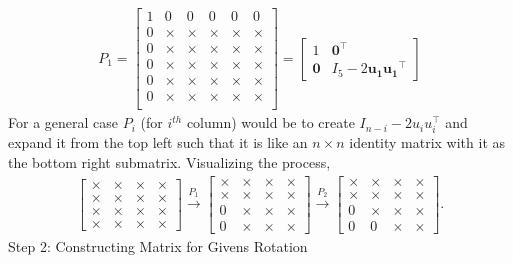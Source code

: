 \documentclass[journal]{IEEEtran}
\begin{document}
\begin{align}
P_1 = \begin{bmatrix}
1 & 0 & 0 & 0 & 0 & 0 \\
0 & \times & \times & \times & \times & \times \\
0 & \times & \times & \times & \times & \times \\
0 & \times & \times & \times & \times & \times \\
0 & \times & \times & \times & \times & \times \\
0 & \times & \times & \times & \times & \times \\
\end{bmatrix} =
\begin{bmatrix}
1 & \mathbf{0}^{\top} \\
\mathbf{0} & I_5 - 2\mathbf{u_1 u_1}^{\top}
\end{bmatrix}
\end{align}
For a general case $P_i$ (for $i^{th}$ column) would be to create $I_{n-i} - 2u_i u_i^{\top}$ and expand it from the top left such that it is like an $n\times n$ identity matrix with it as the bottom right submatrix.\newline
Visualizing the process,
\begin{align}
\begin{bmatrix}
\times & \times & \times & \times \\
\times & \times & \times & \times \\
\times & \times & \times & \times \\
\times & \times & \times & \times
\end{bmatrix}
\xrightarrow{P_1}
\begin{bmatrix}
\times & \times & \times & \times \\
\times & \times & \times & \times \\
0 & \times & \times & \times \\
0 & \times & \times & \times
\end{bmatrix}
\xrightarrow{P_2}
\begin{bmatrix}
\times & \times & \times & \times \\
\times & \times & \times & \times \\
0 & \times & \times & \times \\
0 & 0 & \times & \times
\end{bmatrix}.
\end{align}
Step 2: Constructing Matrix for Givens Rotation \newline
\end{document}
